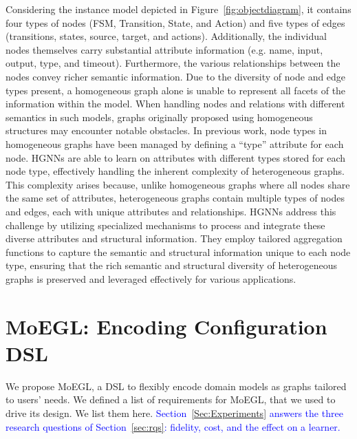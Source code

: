 \documentclass[journal,article,submit,moreauthors,technologies]{Definitions/mdpi}
\newcommand{\rev}[1]{\textcolor{blue}{#1}}
\begin{document}
Considering the instance model depicted in Figure~\ref{fig:objectdiagram}, it contains four types of nodes (FSM, Transition, State, and Action) and five types of edges (transitions, states, source, target, and actions). Additionally, the individual nodes themselves carry substantial attribute information (e.g. name, input, output, type, and timeout). Furthermore, the various relationships between the nodes convey richer semantic information. Due to the diversity of node and edge types present, a homogeneous graph alone is unable to represent all facets of the information within the model. When handling nodes and relations with different semantics in such models, graphs originally proposed using homogeneous structures may encounter notable obstacles. In previous work, node types in homogeneous graphs have been managed by defining a ``type'' attribute for each node. HGNNs are able to learn on attributes with different types stored for each node type, effectively handling the inherent complexity of heterogeneous graphs. This complexity arises because, unlike homogeneous graphs where all nodes share the same set of attributes, heterogeneous graphs contain multiple types of nodes and edges, each with unique attributes and relationships. HGNNs address this challenge by utilizing specialized mechanisms to process and integrate these diverse attributes and structural information. They employ tailored aggregation functions to capture the semantic and structural information unique to each node type, ensuring that the rich semantic and structural diversity of heterogeneous graphs is preserved and leveraged effectively for various applications.

\section{MoEGL: Encoding Configuration DSL} \label{Sec:encodingconfigurationDSL}
We propose MoEGL, a DSL to flexibly encode domain models as graphs tailored to users' needs. We defined a list of requirements for MoEGL, that we used to drive its design. We list them here. \rev{Section~\ref{Sec:Experiments} answers the three research questions of Section~\ref{sec:rqs}: fidelity, cost, and the effect on a learner.}
\end{document}
